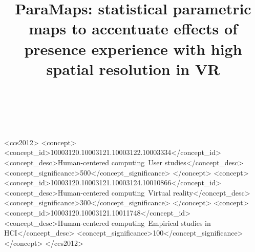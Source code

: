 \documentclass{sigchi}
\def\plaintitle{ParaMaps: statistical parametric maps to accentuate effects of presence experience with high spatial resolution in VR}
\begin{document}
\title{\plaintitle}

\author{%
  \\
  \\
}

\maketitle





\begin{CCSXML}
<ccs2012>
   <concept>
       <concept_id>10003120.10003121.10003122.10003334</concept_id>
       <concept_desc>Human-centered computing~User studies</concept_desc>
       <concept_significance>500</concept_significance>
       </concept>
   <concept>
       <concept_id>10003120.10003121.10003124.10010866</concept_id>
       <concept_desc>Human-centered computing~Virtual reality</concept_desc>
       <concept_significance>300</concept_significance>
       </concept>
   <concept>
       <concept_id>10003120.10003121.10011748</concept_id>
       <concept_desc>Human-centered computing~Empirical studies in HCI</concept_desc>
       <concept_significance>100</concept_significance>
       </concept>
 </ccs2012>
\end{CCSXML}

\end{document}
